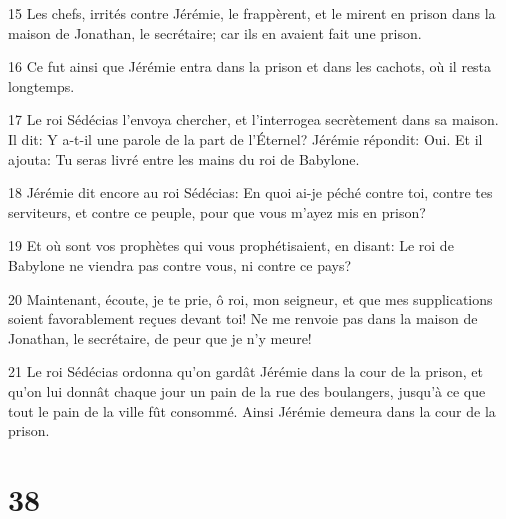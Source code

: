 \par 15 Les chefs, irrités contre Jérémie, le frappèrent, et le mirent en prison dans la maison de Jonathan, le secrétaire; car ils en avaient fait une prison.
\par 16 Ce fut ainsi que Jérémie entra dans la prison et dans les cachots, où il resta longtemps.
\par 17 Le roi Sédécias l'envoya chercher, et l'interrogea secrètement dans sa maison. Il dit: Y a-t-il une parole de la part de l'Éternel? Jérémie répondit: Oui. Et il ajouta: Tu seras livré entre les mains du roi de Babylone.
\par 18 Jérémie dit encore au roi Sédécias: En quoi ai-je péché contre toi, contre tes serviteurs, et contre ce peuple, pour que vous m'ayez mis en prison?
\par 19 Et où sont vos prophètes qui vous prophétisaient, en disant: Le roi de Babylone ne viendra pas contre vous, ni contre ce pays?
\par 20 Maintenant, écoute, je te prie, ô roi, mon seigneur, et que mes supplications soient favorablement reçues devant toi! Ne me renvoie pas dans la maison de Jonathan, le secrétaire, de peur que je n'y meure!
\par 21 Le roi Sédécias ordonna qu'on gardât Jérémie dans la cour de la prison, et qu'on lui donnât chaque jour un pain de la rue des boulangers, jusqu'à ce que tout le pain de la ville fût consommé. Ainsi Jérémie demeura dans la cour de la prison.

\chapter{38}

